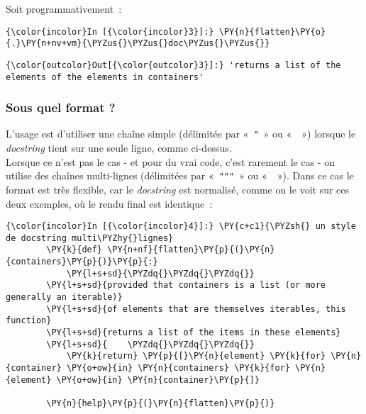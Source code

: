     Soit programmativement~:

    \begin{Verbatim}[commandchars=\\\{\}]
{\color{incolor}In [{\color{incolor}3}]:} \PY{n}{flatten}\PY{o}{.}\PY{n+nv+vm}{\PYZus{}\PYZus{}doc\PYZus{}\PYZus{}}
\end{Verbatim}


\begin{Verbatim}[commandchars=\\\{\}]
{\color{outcolor}Out[{\color{outcolor}3}]:} 'returns a list of the elements of the elements in containers'
\end{Verbatim}
            
    \hypertarget{sous-quel-format}{%
\subsubsection{Sous quel format ?}\label{sous-quel-format}}

    L'usage est d'utiliser une chaîne simple (délimitée par «~\texttt{"}~»
ou «~\texttt{\textquotesingle{}}~») lorsque le \emph{docstring} tient
sur une seule ligne, comme ci-dessus.\\

    Lorsque ce n'est pas le cas - et pour du vrai code, c'est rarement le
cas - on utilise des chaînes multi-lignes (délimitées par
«~\texttt{"""}~» ou
«~\texttt{\textquotesingle{}\textquotesingle{}\textquotesingle{}}~»).
Dans ce cas le format est très flexible, car le \emph{docstring} est
normalisé, comme on le voit sur ces deux exemples, où le rendu final est
identique~:

    \begin{Verbatim}[commandchars=\\\{\}]
{\color{incolor}In [{\color{incolor}4}]:} \PY{c+c1}{\PYZsh{} un style de docstring multi\PYZhy{}lignes}
        \PY{k}{def} \PY{n+nf}{flatten}\PY{p}{(}\PY{n}{containers}\PY{p}{)}\PY{p}{:}
            \PY{l+s+sd}{\PYZdq{}\PYZdq{}\PYZdq{}}
        \PY{l+s+sd}{provided that containers is a list (or more generally an iterable)}
        \PY{l+s+sd}{of elements that are themselves iterables, this function}
        \PY{l+s+sd}{returns a list of the items in these elements}
        \PY{l+s+sd}{    \PYZdq{}\PYZdq{}\PYZdq{}}
            \PY{k}{return} \PY{p}{[}\PY{n}{element} \PY{k}{for} \PY{n}{container} \PY{o+ow}{in} \PY{n}{containers} \PY{k}{for} \PY{n}{element} \PY{o+ow}{in} \PY{n}{container}\PY{p}{]}
        
        \PY{n}{help}\PY{p}{(}\PY{n}{flatten}\PY{p}{)}
\end{Verbatim}


